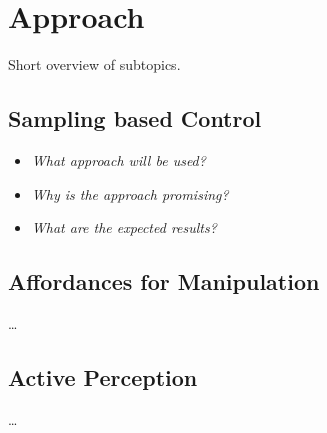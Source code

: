 \section{Approach}
\label{sec:Approach}

Short overview of subtopics.

\subsection{Sampling based Control}
\begin{itemize}
	\item \emph{What approach will be used?}
	\item \emph{Why is the approach promising?}
	\item \emph{What are the expected results?}
\end{itemize}

\subsection{Affordances for Manipulation}
\ldots

\subsection{Active Perception}
\ldots

